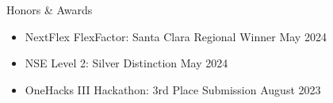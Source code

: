 \documentclass[
  11pt, %
]{public/resume/resume} %
\begin{document}
\begin{rSection}{Honors \& Awards}

  \begin{itemize}
      \setlength\itemsep{-0.7em} %
        
      \item NextFlex FlexFactor: Santa Clara Regional Winner \hfill May 2024
              
      \item NSE Level 2: Silver Distinction \hfill May 2024
              
      \item OneHacks III Hackathon: 3rd Place Submission \hfill August 2023
              


    \end{itemize}

\end{rSection}
\end{document}

